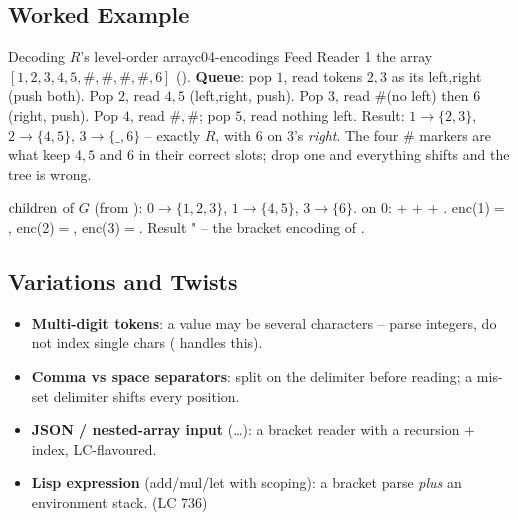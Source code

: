 \subsection{Worked Example}

\begin{example}{Decoding $R$'s level-order array}{c04-encodings}
Feed Reader 1 the array $[1,2,3,4,5,\#,\#,\#,\#,6]$ ().
\textbf{Queue}: pop $1$, read tokens $2,3$ as its left,right (push both). Pop $2$, read $4,5$
(left,right, push). Pop $3$, read $\#$(no left) then $6$(right, push). Pop $4$, read $\#,\#$; pop
$5$, read nothing left. Result: $1\!\to\!\{2,3\}$, $2\!\to\!\{4,5\}$, $3\!\to\!\{\_,6\}$ -- exactly
$R$, with $6$ on $3$'s \emph{right}. The four $\#$ markers are what keep $4,5$ and
$6$ in their correct slots; drop one and everything shifts and the tree is wrong.
\end{example}
\begin{tracebox}
$\operatorname{children}$ of $G$ (from ): $0\!\to\!\{1,2,3\}$, $1\!\to\!\{4,5\}$, $3\!\to\!\{6\}$.
 on $0$:  +  + 
+ . enc(1)$=$, enc(2)$=$, enc(3)$=$.
Result " -- the bracket encoding of . \checkmark
\end{tracebox}

\subsection{Variations and Twists}

\begin{itemize}[nosep]
  \item \textbf{Multi-digit tokens}: a value may be several characters -- parse integers, do
        not index single chars ( handles this).   \hfill{}
  \item \textbf{Comma vs space separators}: split on the delimiter before reading; a
        mis-set delimiter shifts every position.                               \hfill{}
  \item \textbf{JSON / nested-array input} (\ldots): a bracket reader with
        a recursion + index, LC-flavoured.                                     \hfill{}
  \item \textbf{Lisp expression} (add/mul/let with scoping): a bracket parse \emph{plus} an
        environment stack.                                        \hfill{} (LC 736)
\end{itemize}

